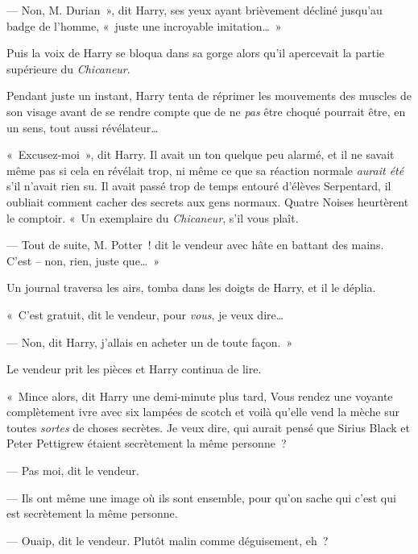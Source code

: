 --- Non, M. Durian~», dit Harry, ses yeux ayant brièvement décliné jusqu'au badge de l'homme, «~juste une incroyable imitation…~»

Puis la voix de Harry se bloqua dans sa gorge alors qu'il apercevait la partie supérieure du \emph{Chicaneur}.

Pendant juste un instant, Harry tenta de réprimer les mouvements des muscles de son visage avant de se rendre compte que de ne \emph{pas} être choqué pourrait être, en un sens, tout aussi révélateur…

«~Excusez-moi~», dit Harry. Il avait un ton quelque peu alarmé, et il ne savait même pas si cela en révélait trop, ni même ce que sa réaction normale \emph{aurait été} s'il n'avait rien su. Il avait passé trop de temps entouré d'élèves Serpentard, il oubliait comment cacher des secrets aux gens normaux. Quatre Noises heurtèrent le comptoir. «~Un exemplaire du \emph{Chicaneur}, s'il vous plaît.

--- Tout de suite, M. Potter~! dit le vendeur avec hâte en battant des mains. C'est -- non, rien, juste que…~»

Un journal traversa les airs, tomba dans les doigts de Harry, et il le déplia.


«~C'est gratuit, dit le vendeur, pour \emph{vous}, je veux dire…

--- Non, dit Harry, j'allais en acheter un de toute façon.~»

Le vendeur prit les pièces et Harry continua de lire.

«~Mince alors, dit Harry une demi-minute plus tard, Vous rendez une voyante complètement ivre avec six lampées de scotch et voilà qu'elle vend la mèche sur toutes \emph{sortes} de choses secrètes. Je veux dire, qui aurait pensé que Sirius Black et Peter Pettigrew étaient secrètement la même personne~?

--- Pas moi, dit le vendeur.

--- Ils ont même une image où ils sont ensemble, pour qu'on sache qui c'est qui est secrètement la même personne.

--- Ouaip, dit le vendeur. Plutôt malin comme déguisement, eh~?

